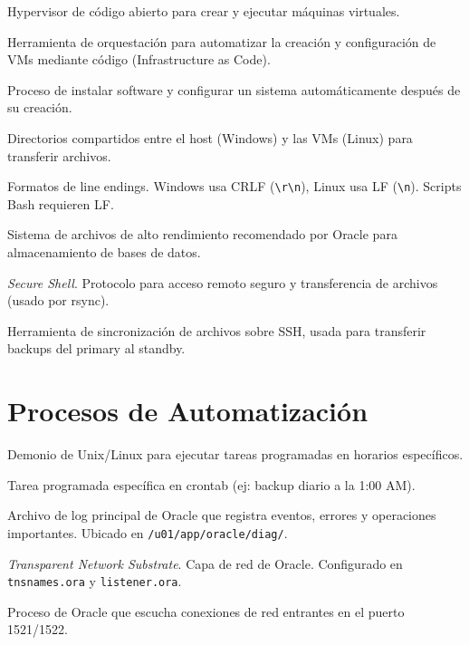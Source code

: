 \documentclass[11pt, a4paper]{report}
\begin{document}
\begin{description}[style=nextline, leftmargin=3cm, font=\normalfont\bfseries]
    \item[VirtualBox] Hypervisor de código abierto para crear y ejecutar máquinas virtuales.

    \item[Vagrant] Herramienta de orquestación para automatizar la creación y configuración de VMs mediante código (Infrastructure as Code).

    \item[Provisioning] Proceso de instalar software y configurar un sistema automáticamente después de su creación.

    \item[Synced Folders] Directorios compartidos entre el host (Windows) y las VMs (Linux) para transferir archivos.

    \item[CRLF vs LF] Formatos de line endings. Windows usa CRLF (\texttt{\textbackslash r\textbackslash n}), Linux usa LF (\texttt{\textbackslash n}). Scripts Bash requieren LF.

    \item[XFS] Sistema de archivos de alto rendimiento recomendado por Oracle para almacenamiento de bases de datos.

    \item[SSH] \textit{Secure Shell}. Protocolo para acceso remoto seguro y transferencia de archivos (usado por rsync).

    \item[rsync] Herramienta de sincronización de archivos sobre SSH, usada para transferir backups del primary al standby.
\end{description}

\section{Procesos de Automatización}

\begin{description}[style=nextline, leftmargin=3cm, font=\normalfont\bfseries]
    \item[Cron] Demonio de Unix/Linux para ejecutar tareas programadas en horarios específicos.

    \item[Cron Job] Tarea programada específica en crontab (ej: backup diario a la 1:00 AM).

    \item[Alert Log] Archivo de log principal de Oracle que registra eventos, errores y operaciones importantes. Ubicado en \texttt{/u01/app/oracle/diag/}.

    \item[TNS] \textit{Transparent Network Substrate}. Capa de red de Oracle. Configurado en \texttt{tnsnames.ora} y \texttt{listener.ora}.

    \item[Listener] Proceso de Oracle que escucha conexiones de red entrantes en el puerto 1521/1522.
\end{description}
\end{document}
